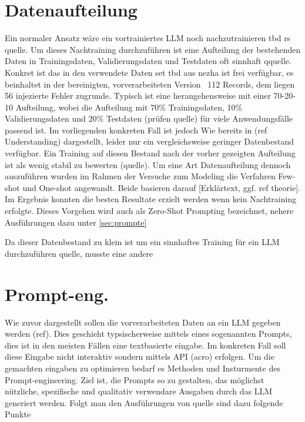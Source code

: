 \section{Datenaufteilung}
\label{sec:datasplit}
Ein normaler Ansatz wäre ein vortrainiertes LLM noch nachzutrainieren tbd rs quelle. Um dieses Nachtraining durchzuführen ist eine Aufteilung der bestehenden Daten in Trainingsdaten, Validierungsdaten und Testdaten oft sinnhaft qquelle. Konkret ist das in den verwendete Daten set tbd aus nezha ist frei verfügbar, es beinhaltet in der bereinigten, vorverarbeiteten Version ~112 Records, dem liegen 56 injezierte Fehler zugrunde. Typisch ist eine herangehensweise mit einer 70-20-10 Aufteilung, wobei die Aufteilung mit 70\% Trainingsdaten, 10\% Validierungsdaten und  20\% Testdaten (prüfen quelle) für viele Anwendungsfälle passend ist. Im vorliegenden konkreten Fall ist jedoch Wie bereits in  (ref Understanding) dargestellt, leider nur ein vergleichsweise geringer Datenbestand verfügbar. Ein Training auf diesen Bestand nach der vorher gezeigten Aufteilung ist als wenig stabil zu bewerten (quelle). Um eine Art Datenaufteilung dennoch auszuführen wurden im Rahmen der Versuche zum Modeling die Verfahren Few-shot und One-shot angewandt. Beide basieren darauf [Erklärtext, ggf. ref theorie]. Im Ergebnis konnten die besten Resultate erzielt werden wenn kein Nachtraining erfolgte. Dieses Vorgehen wird auch als Zero-Shot Prompting bezeichnet, nehere Ausführungen dazu unter \autoref{sec:prompte}


Da dieser Datenbestand zu klein ist um ein sinnhaftes Training für ein LLM durchzuführen quelle, musste eine andere 

\section{Prompt-eng.}
\label{sec:prompte}
Wie zuvor dargestellt sollen die vorverarbeiteten Daten an ein LLM gegeben werden (ref). Dies geschieht typsischerweise mittels eines sogenannten Prompts, dies ist in den meisten Fällen eine textbasierte eingabe. Im konkreten Fall soll diese Eingabe nicht interaktiv sondern mittels API (acro) erfolgen. Um die gemachten eingaben zu optimieren bedarf es Methoden und Insturmente des Prompt-engineering. Ziel ist, die Prompts so zu gestalten, das möglichst nützliche, spezifische und qualitativ verwendare Ausgaben durch das LLM generiert werden. Folgt man den Ausführungen von quelle sind dazu folgende Punkte 